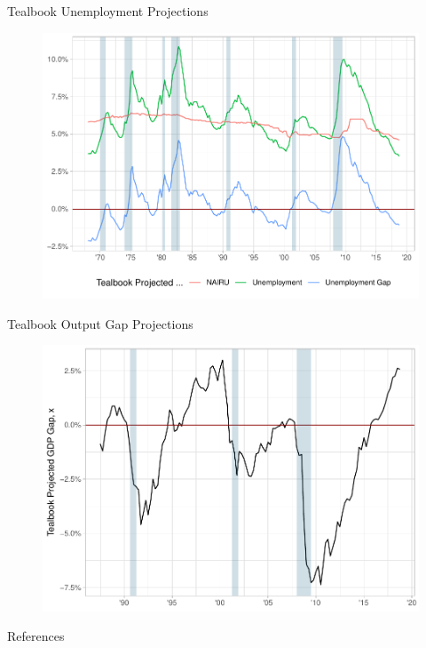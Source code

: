 \documentclass[10pt,aspectratio=169]{beamer}
\begin{document}
    \begin{frame}{Tealbook Unemployment Projections}
        \begin{figure}[!h]\centering
            \begin{minipage}{0.7\textwidth}\centering
                \includegraphics[width=\textwidth]{expected_unemployment_plot.pdf}
            \end{minipage}
        \end{figure}
    \end{frame}



    \begin{frame}{Tealbook Output Gap Projections}
        \begin{figure}[!h]\centering
            \begin{minipage}{0.6\textwidth}\centering
                \includegraphics[width=\textwidth]{expected_gap_plot.pdf}
            \end{minipage}
        \end{figure}

    \end{frame}

\begin{frame}[allowframebreaks]{References}
    \footnotesize
    \printbibliography
    \end{frame}
\end{document}
